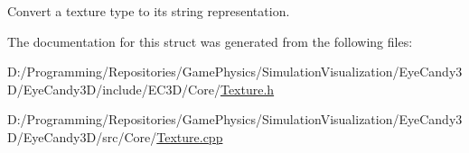Convert a texture type to its string representation. 



The documentation for this struct was generated from the following files\+:\begin{DoxyCompactItemize}
\item 
D\+:/\+Programming/\+Repositories/\+Game\+Physics/\+Simulation\+Visualization/\+Eye\+Candy3\+D/\+Eye\+Candy3\+D/include/\+E\+C3\+D/\+Core/\mbox{\hyperlink{_texture_8h}{Texture.\+h}}\item 
D\+:/\+Programming/\+Repositories/\+Game\+Physics/\+Simulation\+Visualization/\+Eye\+Candy3\+D/\+Eye\+Candy3\+D/src/\+Core/\mbox{\hyperlink{_texture_8cpp}{Texture.\+cpp}}\end{DoxyCompactItemize}
